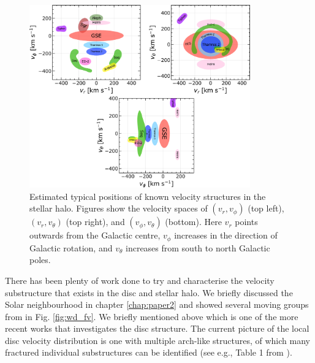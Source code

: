 \begin{figure}[t]
    \centering
    \includegraphics[width=0.85\textwidth]{images/map_only_b.pdf}
    \caption{Estimated typical positions of known velocity structures in the stellar halo. Figures show the velocity spaces of $(v_r, v_\phi)$ (top left), $(v_r, v_\theta)$ (top right), and $(v_\phi, v_\theta)$ (bottom). Here $v_r$ points outwards from the Galactic centre, $v_\phi$ increases in the direction of Galactic rotation, and $v_\theta$ increases from south to north Galactic poles.} %
    \label{fig:halo_map}
\end{figure}
There has been plenty of work done to try and characterise the velocity substructure that exists in the disc and stellar halo. We briefly discussed the Solar neighbourhood in chapter \ref{chap:paper2} and showed several moving groups from \cite{antoja:12} in Fig. \ref{fig:wd_fv}. We briefly mentioned \cite{lucchini:22} above which is one of the more recent works that investigates the disc structure. The current picture of the local disc velocity distribution is one with multiple arch-like structures, of which many fractured individual substructures can be identified (see e.g., Table 1 from \citealt{lucchini:22}). 

